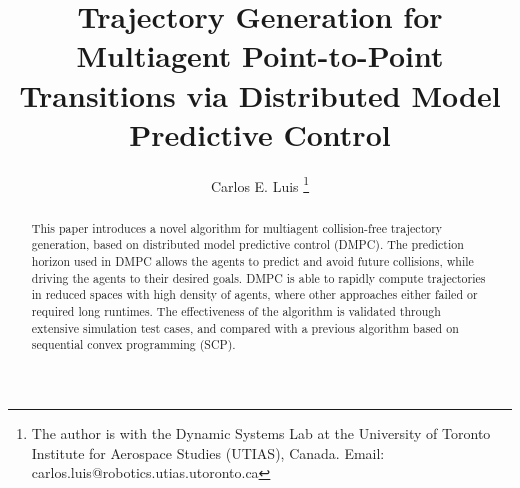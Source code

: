 \documentclass[letterpaper,10pt,conference,twocolumn]{ieeeconf}
\title{\LARGE \bf
Trajectory Generation for Multiagent Point-to-Point Transitions via Distributed Model Predictive Control
}
\author{Carlos E. Luis%
\thanks{The author is with the Dynamic Systems Lab at the University of Toronto Institute for Aerospace Studies (UTIAS), Canada. Email: carlos.luis@robotics.utias.utoronto.ca}%
}
\begin{document}
\maketitle
\thispagestyle{empty}
\pagestyle{empty}


\begin{abstract}
This paper introduces a novel algorithm for multiagent collision-free trajectory generation, based on distributed model predictive control (DMPC). The prediction horizon used in DMPC allows the agents to predict and avoid future collisions, while driving the agents to their desired goals. DMPC is able to rapidly compute trajectories in reduced spaces with high density of agents, where other approaches either failed or required long runtimes. The effectiveness of the algorithm is validated through extensive simulation test cases, and compared with a previous algorithm based on sequential convex programming (SCP).
\end{abstract}




\setcounter{section}{0}









% 
\end{document}
